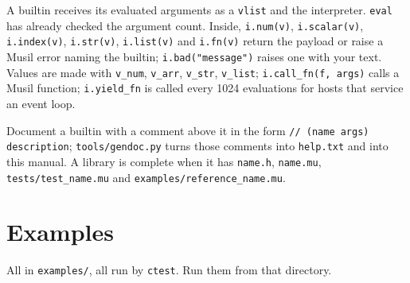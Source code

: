 \documentclass[11pt,a4paper]{article}
\begin{document}
A builtin receives its evaluated arguments as a \texttt{vlist} and the interpreter.
\texttt{eval} has already checked the argument count. Inside, \texttt{i.num(v)},
\texttt{i.scalar(v)}, \texttt{i.index(v)}, \texttt{i.str(v)}, \texttt{i.list(v)}
and \texttt{i.fn(v)} return the payload or raise a Musil error naming the builtin;
\texttt{i.bad("message")} raises one with your text. Values are made with
\texttt{v\_num}, \texttt{v\_arr}, \texttt{v\_str}, \texttt{v\_list};
\texttt{i.call\_fn(f, args)} calls a Musil function; \texttt{i.yield\_fn} is called
every 1024 evaluations for hosts that service an event loop.

Document a builtin with a comment above it in the form
\texttt{// (name args) description}; \texttt{tools/gendoc.py} turns those comments
into \texttt{help.txt} and into this manual. A library is complete when it has
\texttt{name.h}, \texttt{name.mu}, \texttt{tests/test\_name.mu} and
\texttt{examples/reference\_name.mu}.

\section{Examples}

All in \texttt{examples/}, all run by \texttt{ctest}. Run them from that directory.
\end{document}
